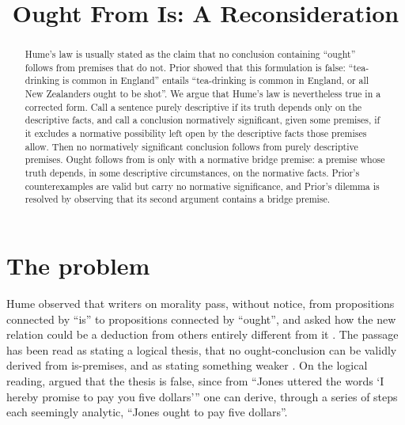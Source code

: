 \documentclass{situationist-preprint}
\title{Ought From Is: A Reconsideration}
\begin{document}
\maketitle

\begin{abstract}
Hume's law is usually stated as the claim that no conclusion containing \enquote{ought} follows from premises that do not. Prior showed that this formulation is false: \enquote{tea-drinking is common in England} entails \enquote{tea-drinking is common in England, or all New Zealanders ought to be shot}. We argue that Hume's law is nevertheless true in a corrected form. Call a sentence purely descriptive if its truth depends only on the descriptive facts, and call a conclusion normatively significant, given some premises, if it excludes a normative possibility left open by the descriptive facts those premises allow. Then no normatively significant conclusion follows from purely descriptive premises. Ought follows from is only with a normative bridge premise: a premise whose truth depends, in some descriptive circumstances, on the normative facts. Prior's counterexamples are valid but carry no normative significance, and Prior's dilemma is resolved by observing that its second argument contains a bridge premise.
\end{abstract}

\section{The problem}

Hume observed that writers on morality pass, without notice, from propositions connected by \enquote{is} to propositions connected by \enquote{ought}, and asked how the new relation could be a deduction from others entirely different from it \citep[3.1.1]{HumeTreatise}. The passage has been read as stating a logical thesis, that no ought-conclusion can be validly derived from is-premises, and as stating something weaker \citep{MacIntyre1959}. On the logical reading, \citet{Searle1964} argued that the thesis is false, since from \enquote{Jones uttered the words \enquote{I hereby promise to pay you five dollars}} one can derive, through a series of steps each seemingly analytic, \enquote{Jones ought to pay five dollars}.
\end{document}
